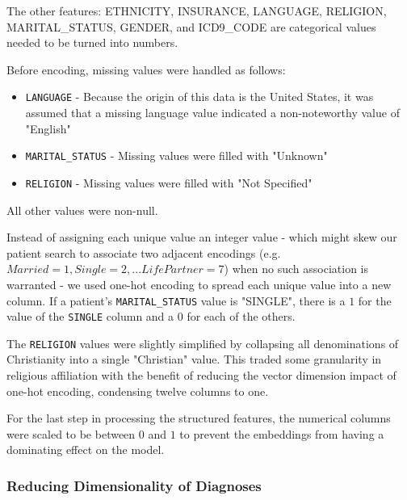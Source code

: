 \documentclass[acmtog]{acmart}
\begin{document}
The other features: {\ttfamily ETHNICITY, INSURANCE, LANGUAGE, RELIGION, MARITAL\_STATUS, GENDER, and ICD9\_CODE} are categorical values needed to be turned into numbers. 

\bigskip

Before encoding, missing values were handled as follows:
\begin{itemize}
    \item \texttt{LANGUAGE} - Because the origin of this data is the United States, it was assumed that a missing language value indicated a non-noteworthy value of "English"
    \item \texttt{MARITAL\_STATUS} - Missing values were filled with "Unknown"
    \item \texttt{RELIGION} - Missing values were filled with "Not Specified"
\end{itemize}
All other values were non-null.

\bigskip

Instead of assigning each unique value an integer value - which might skew our patient search to associate two adjacent encodings (e.g. $Married = 1, Single = 2, ... Life Partner = 7$) when no such association is warranted - we used one-hot encoding \cite{kaggle_one_hot_rutecki} to spread each unique value into a new column. If a patient's \texttt{MARITAL\_STATUS} value is "SINGLE", there is a $1$ for the value of the \texttt{SINGLE} column and a $0$ for each of the others.

\bigskip

The \texttt{RELIGION} values were slightly simplified by collapsing all denominations of Christianity into a single "Christian" value. This traded some granularity in religious affiliation with the benefit of reducing the vector dimension impact of one-hot encoding, condensing twelve columns to one.

\bigskip

For the last step in processing the structured features, the numerical columns were scaled to be between $0$ and $1$ to prevent the embeddings from having a dominating effect on the model.

\subsubsection{Reducing Dimensionality of Diagnoses}
\end{document}
